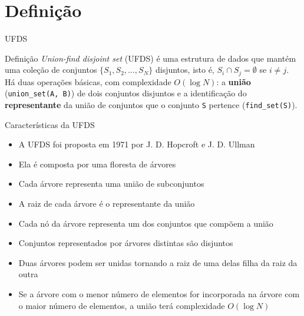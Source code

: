 \section{Definição}

\begin{frame}[fragile]{UFDS}

    \begin{block}{Definição}
        \textit{Union-find disjoint set} (UFDS) é uma estrutura de dados que mantém uma coleção
        de conjuntos $\lbrace S_1, S_2, \ldots, S_N\rbrace$ disjuntos, isto é, $S_i\cap S_j =
        \emptyset$ se $i\neq j$. Há duas operações básicas, com complexidade $O(\log N)$: a 
        \textbf{união} (\texttt{union\_set(A, B)}) de dois conjuntos disjuntos e a identificação 
        do \textbf{representante} da união de conjuntos que o conjunto \texttt{S} pertence 
        (\texttt{find\_set(S)}).
    \end{block}

\end{frame}

\begin{frame}[fragile]{Características da UFDS}

    \begin{itemize}
        \item A UFDS foi proposta em 1971 por J. D. Hopcroft e J. D. Ullman

        \item Ela é composta por uma floresta de árvores

        \item Cada árvore representa uma união de subconjuntos

        \item A raiz de cada árvore é o representante da união

        \item Cada nó da árvore representa um dos conjuntos que compõem a união

        \item Conjuntos representados por árvores distintas são disjuntos

        \item Duas árvores podem ser unidas tornando a raiz de uma delas filha da raiz da outra

        \item Se a árvore com o menor número de elementos for incorporada na árvore com o maior número de
            elementos, a união terá complexidade $O(\log N)$
    \end{itemize}

\end{frame}

